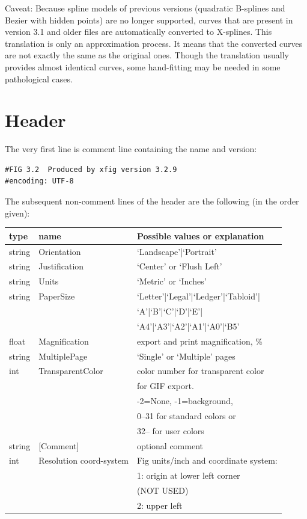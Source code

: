 \documentclass[10pt, a4paper, english]{article}%
\begin{document}
Caveat: Because spline models of previous versions 
(quadratic B-splines and Bezier with hidden points) 
are no longer supported, 
curves that are present in version 3.1 and older files 
are automatically converted to X-splines. 
This translation is only an approximation process. 
It means that the converted curves 
are not exactly the same as the original ones. 
Though the translation usually provides almost identical curves, 
some hand-fitting may be needed in some pathological cases. 


\section{Header}\label{sec:header}

The very first line is comment line containing the name and version: 
%
\begin{verbatim}
#FIG 3.2  Produced by xfig version 3.2.9 
#encoding: UTF-8
\end{verbatim}


The subsequent non-comment lines of the header are the following 
(in the order given): \\
%
\begin{tabular}{lll}
\toprule
type & name & Possible values or explanation \\
\midrule
\midrule
string & Orientation             & `Landscape'|`Portrait' \\
string & Justification           & `Center' or `Flush Left' \\
string & Units                   & `Metric' or `Inches' \\
string & PaperSize               & `Letter'|`Legal'|`Ledger'|`Tabloid'|\\
&&                                 `A'|`B'|`C'|`D'|`E'|\\
&&                                 `A4'|`A3'|`A2'|`A1'|`A0'|`B5' \\
float  & Magnification           & export and print magnification, \% \\
string & MultiplePage           & `Single' or `Multiple' pages \\
int    & TransparentColor       & color number for transparent color \\
&&                                 for GIF export. \\
&&                                -2=None, -1=background, \\
&&                                0--31 for standard colors or \\
&&                                32-- for user colors \\
string & [Comment]              & optional comment \\%
int    & Resolution coord-system & Fig units/inch and coordinate system:\\
&&                                 1: origin at lower left corner \\
&&                                    (NOT USED)\\
&&                                 2: upper left \\
\bottomrule
\end{tabular}
\end{document}
